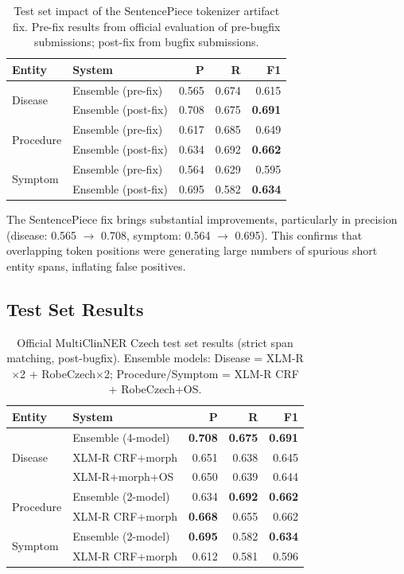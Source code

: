 \documentclass[11pt]{article}
\begin{document}
\begin{table}[h]
\centering
\small
\begin{tabular}{llrrr}
\toprule
\textbf{Entity} & \textbf{System} & \textbf{P} & \textbf{R} & \textbf{F1} \\
\midrule
\multirow{2}{*}{Disease}
  & Ensemble (pre-fix) & 0.565 & 0.674 & 0.615 \\
  & Ensemble (post-fix) & 0.708 & 0.675 & \textbf{0.691} \\
\midrule
\multirow{2}{*}{Procedure}
  & Ensemble (pre-fix) & 0.617 & 0.685 & 0.649 \\
  & Ensemble (post-fix) & 0.634 & 0.692 & \textbf{0.662} \\
\midrule
\multirow{2}{*}{Symptom}
  & Ensemble (pre-fix) & 0.564 & 0.629 & 0.595 \\
  & Ensemble (post-fix) & 0.695 & 0.582 & \textbf{0.634} \\
\bottomrule
\end{tabular}
\caption{Test set impact of the SentencePiece tokenizer artifact fix. Pre-fix results from
official evaluation of pre-bugfix submissions; post-fix from bugfix submissions.}
\label{tab:bugfix}
\end{table}

The SentencePiece fix brings substantial improvements, particularly in precision (disease:
0.565 $\to$ 0.708, symptom: 0.564 $\to$ 0.695). This confirms that overlapping token
positions were generating large numbers of spurious short entity spans, inflating false positives.

\subsection{Test Set Results}

\begin{table}[h]
\centering
\small
\begin{tabular}{llrrr}
\toprule
\textbf{Entity} & \textbf{System} & \textbf{P} & \textbf{R} & \textbf{F1} \\
\midrule
\multirow{3}{*}{Disease}
  & Ensemble (4-model) & \textbf{0.708} & \textbf{0.675} & \textbf{0.691} \\
  & XLM-R CRF+morph    & 0.651          & 0.638          & 0.645 \\
  & XLM-R+morph+OS     & 0.650          & 0.639          & 0.644 \\
\midrule
\multirow{2}{*}{Procedure}
  & Ensemble (2-model) & 0.634 & \textbf{0.692} & \textbf{0.662} \\
  & XLM-R CRF+morph    & \textbf{0.668} & 0.655          & 0.662 \\
\midrule
\multirow{2}{*}{Symptom}
  & Ensemble (2-model) & \textbf{0.695} & 0.582 & \textbf{0.634} \\
  & XLM-R CRF+morph    & 0.612          & 0.581 & 0.596 \\
\bottomrule
\end{tabular}
\caption{Official MultiClinNER Czech test set results (strict span matching, post-bugfix).
Ensemble models: Disease = XLM-R$\times$2 + RobeCzech$\times$2; Procedure/Symptom = XLM-R CRF + RobeCzech+OS.}
\label{tab:test}
\end{table}
\end{document}
